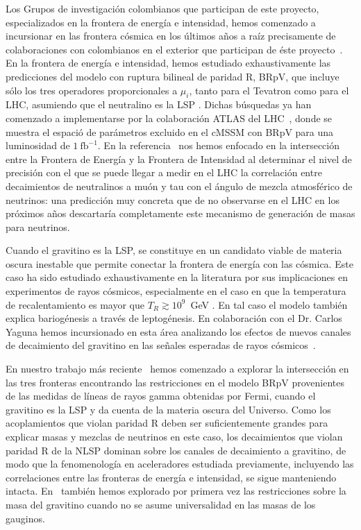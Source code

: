 Los Grupos de investigación colombianos que participan de este
proyecto, especializados en la frontera de energía e intensidad,
hemos comenzado a incursionar en las frontera cósmica en los últimos
años a raíz precisamente de colaboraciones con colombianos en el
exterior que participan de éste
proyecto~\cite{Sierra:2008wj,Sierra:2009zq,Choi:2010jt}. En la
frontera de energía e intensidad, hemos estudiado exhaustivamente las
predicciones del modelo con ruptura bilineal de paridad R, BRpV, que
incluye sólo los tres operadores proporcionales a $\mu_i$, tanto para
el Tevatron como para el LHC, asumiendo que el neutralino es la
LSP
\cite{Magro:2003zb,deCampos:2005ri,deCampos:2007bn,deCampos:2008ic,deCampos:2008re,DeCampos:2010yu}. Dichas
búsquedas ya han comenzado a implementarse por la colaboración ATLAS
del LHC~\cite{:2011iu}, donde se muestra el espació de parámetros
excluido en el cMSSM con BRpV para una luminosidad de $1\
\text{fb}^{-1}$.  En la referencia~\cite{DeCampos:2010yu} nos hemos
enfocado en la intersección entre la Frontera de Energía y la Frontera
de Intensidad al determinar el nivel de precisión con el que se puede
llegar a medir en el LHC la correlación entre decaimientos de
neutralinos a muón y tau con el ángulo de mezcla atmosférico de
neutrinos: una predicción muy concreta que de no observarse en el LHC
en los próximos años descartaría completamente este mecanismo de
generación de masas para neutrinos.

Cuando el gravitino es la LSP, se constituye en un candidato viable de
materia oscura inestable que permite conectar la frontera de energía
con las cósmica. Este caso ha sido estudiado exhaustivamente en la
literatura por sus implicaciones en experimentos de rayos cósmicos,
especialmente en el caso en que la temperatura de recalentamiento es
mayor que $T_R\gtrsim 10^9$~GeV
\cite{Takayama:2000uz,Buchmuller:2007ui,Bertone:2007aw,Ibarra:2007wg,Ishiwata:2008cu,Covi:2008jy,Ibarra:2008qg}.
En tal caso el modelo también explica bariogénesis a través de
leptogénesis. En colaboración con el Dr. Carlos Yaguna hemos
incursionado en esta área analizando los efectos de nuevos canales de
decaimiento del gravitino en las señales esperadas de rayos
cósmicos~\cite{Choi:2010jt}.

En nuestro trabajo más reciente~\cite{Restrepo:2011rj} hemos comenzado a
explorar la intersección en las tres fronteras
encontrando las restricciones en el modelo BRpV provenientes de las
medidas de líneas de rayos gamma obtenidas por Fermi, cuando el
gravitino es la LSP y da cuenta de la
materia oscura del Universo. Como los acoplamientos que violan paridad
R deben ser suficientemente grandes para explicar masas y mezclas de
neutrinos en este caso, los decaimientos que violan paridad R de la
NLSP dominan
sobre los canales de decaimiento a gravitino, de modo que la
fenomenología en aceleradores estudiada previamente, incluyendo las correlaciones entre las
fronteras de energía e intensidad, se sigue
manteniendo intacta. En~\cite{Restrepo:2011rj} también hemos explorado
por primera vez las restricciones sobre la masa del gravitino cuando
no se asume universalidad en las masas de los gauginos.

